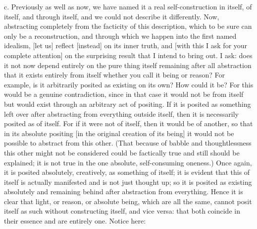 c. Previously as well as now,
we have named it a real self-construction
in itself, of itself, and through itself,
and we could not describe it differently.
Now, abstracting completely from
the facticity of this description,
which to be sure can only be a reconstruction,
and through which we happen into the first named idealism,
[let us] reflect [instead] on its inner truth,
and [with this I ask for your complete attention]
on the surprising result that I intend to bring out.
I ask: does it not now depend entirely
on the pure thing itself
remaining after all abstraction
that it exists entirely from itself
whether you call it being or reason?
For example, is it arbitrarily posited
as existing on its own?
How could it be?
For this would be a genuine contradiction,
since in that case it would not be from itself
but would exist through an arbitrary act of positing.
If it is posited as something left over
after abstracting from everything outside itself,
then it is necessarily posited as of itself.
For if it were not of itself,
then it would be of another,
so that in its absolute positing
[in the original creation of its being]
it would not be possible to abstract from this other.
(That because of babble and thoughtlessness this other might not
be considered could be factically true and still should be explained;
it is not true in the one absolute, self-consuming oneness.)
Once again, it is posited absolutely,
creatively, as something of itself;
it is evident that this of itself is
actually manifested and is not just thought up;
so it is posited as existing absolutely
and remaining behind after abstraction from everything.
Hence it is clear that light, or reason,
or absolute being, which are all the same,
cannot posit itself as such without constructing itself, and vice versa:
that both coincide in their essence and are entirely one.
Notice here:

